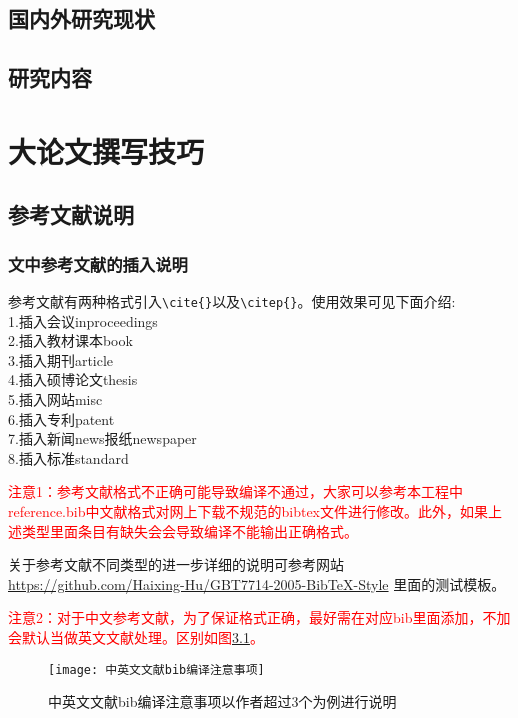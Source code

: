 \documentclass[master]{hdu-thesis}
\begin{document}
\section{国内外研究现状}
\section{研究内容}



\chapter{大论文撰写技巧}


\section{参考文献说明}
\subsection{文中参考文献的插入说明}
参考文献有两种格式引入\verb+\cite{}+以及\verb+\citep{}+。使用效果可见下面介绍:\\
1.插入会议inproceedings\cite{zhao2015bearing0}\\
2.插入教材课本book\cite{williams1991probability,chengzhaolin2006,zhangsan2007}\\
3.插入期刊article\cite{cao2011formation,xue2015formation}\\
4.插入硕博论文thesis\cite{lisi2015,wangwu2015,deans2005bearings}\\
5.插入网站misc\cite{irdawebsite,h7n9,wikipedia_moores_law}\\
6.插入专利patent\cite{xiao2012yi,p6915001}\\
7.插入新闻news报纸newspaper\cite{zhang2000,renminribao}\\
8.插入标准standard\cite{gbt3469-1983}

\textcolor{red}{注意1：参考文献格式不正确可能导致编译不通过，大家可以参考本工程中reference.bib中文献格式对网上下载不规范的bibtex文件进行修改。此外，如果上述类型里面条目有缺失会会导致编译不能输出正确格式。}

关于参考文献不同类型的进一步详细的说明可参考网站\url{https://github.com/Haixing-Hu/GBT7714-2005-BibTeX-Style}
里面的测试模板。


\textcolor{red}{注意2：对于中文参考文献，为了保证格式正确，最好需在对应bib里面添加，不加会默认当做英文文献处理。区别如图\ref{fig_bib0}。}

\begin{figure}[!htb]
  \centering
  \texttt{[image: 中英文文献bib编译注意事项]}
  \caption{中英文文献bib编译注意事项以作者超过3个为例进行说明}
  \label{fig_bib0}
\end{figure}
\end{document}
